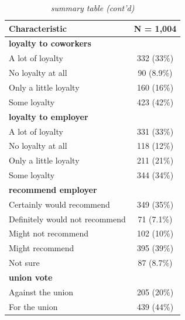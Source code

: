 \documentclass[
  11pt,
  oneside]{article}
\begin{document}
\begin{table}

\caption{\label{tab:tab-sum-gr}\textit{summary table (cont'd)}}
\centering
\begin{tabular}[t]{l|c}
\hline
\textbf{Characteristic} & \textbf{N = 1,004}\\
\hline
\textbf{loyalty to coworkers} & \\
\hline
\hspace{1em}A lot of loyalty & 332 (33\%)\\
\hline
\hspace{1em}No loyalty at all & 90 (8.9\%)\\
\hline
\hspace{1em}Only a little loyalty & 160 (16\%)\\
\hline
\hspace{1em}Some loyalty & 423 (42\%)\\
\hline
\textbf{loyalty to employer} & \\
\hline
\hspace{1em}A lot of loyalty & 331 (33\%)\\
\hline
\hspace{1em}No loyalty at all & 118 (12\%)\\
\hline
\hspace{1em}Only a little loyalty & 211 (21\%)\\
\hline
\hspace{1em}Some loyalty & 344 (34\%)\\
\hline
\textbf{recommend employer} & \\
\hline
\hspace{1em}Certainly would recommend & 349 (35\%)\\
\hline
\hspace{1em}Definitely would not recommend & 71 (7.1\%)\\
\hline
\hspace{1em}Might not recommend & 102 (10\%)\\
\hline
\hspace{1em}Might recommend & 395 (39\%)\\
\hline
\hspace{1em}Not sure & 87 (8.7\%)\\
\hline
\textbf{union vote} & \\
\hline
\hspace{1em}Against the union & 205 (20\%)\\
\hline
\hspace{1em}For the union & 439 (44\%)\\

\end{tabular}
\end{table}
\end{document}
